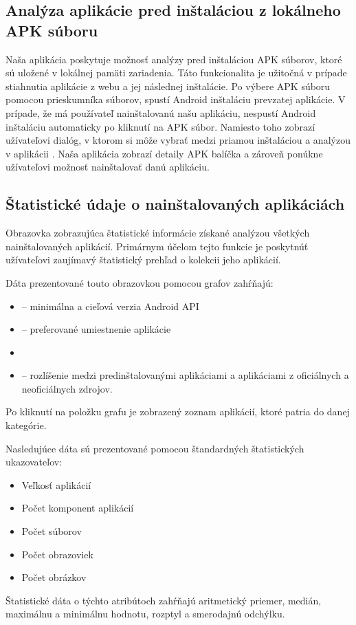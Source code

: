 \subsection{Analýza aplikácie pred inštaláciou z lokálneho APK súboru}
Naša aplikácia poskytuje možnosť analýzy pred inštaláciou APK súborov, ktoré sú uložené v lokálnej pamäti zariadenia. Táto funkcionalita je užitočná v prípade stiahnutia aplikácie z webu a jej následnej inštalácie. Po výbere APK súboru pomocou prieskumníka súborov, spustí Android inštaláciu prevzatej aplikácie. V prípade, že má používateľ nainštalovanú našu aplikáciu, nespustí Android inštaláciu automaticky po kliknutí na APK súbor. Namiesto toho zobrazí užívateľovi dialóg, v ktorom si môže vybrať medzi priamou inštaláciou a analýzou v aplikácii . Naša aplikácia zobrazí detaily APK balíčka a zároveň ponúkne užívateľovi možnosť nainštalovať danú aplikáciu.

\subsection{Štatistické údaje o nainštalovaných aplikáciách}
Obrazovka zobrazujúca štatistické informácie získané analýzou všetkých nainštalovaných aplikácií. Primárnym účelom tejto funkcie je poskytnúť užívateľovi zaujímavý štatistický prehľad o kolekcii jeho aplikácií. 

\noindent Dáta prezentované touto obrazovkou pomocou grafov zahŕňajú:
\begin{itemize}
	\item {} -- minimálna a cieľová verzia Android API
	\item {} -- preferované umiestnenie aplikácie
	\item {}
	\item {} -- rozlíšenie medzi predinštalovanými aplikáciami a aplikáciami z oficiálnych a neoficiálnych zdrojov. 
\end{itemize}
\noindent Po kliknutí na položku grafu je zobrazený zoznam aplikácií, ktoré patria do danej kategórie.

\noindent Nasledujúce dáta sú prezentované pomocou štandardných štatistických ukazovateľov:
\begin{itemize}
	\item Veľkosť aplikácií
	\item Počet komponent aplikácií
	\item Počet súborov
	\item Počet obrazoviek
	\item Počet obrázkov
\end{itemize}
Štatistické dáta o týchto atribútoch zahŕňajú aritmetický priemer, medián, maximálnu a minimálnu hodnotu, rozptyl a smerodajnú odchýlku. 

